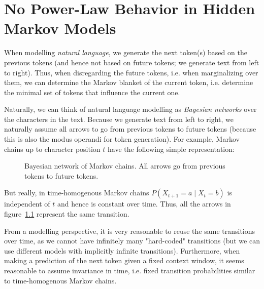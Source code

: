 \documentclass[../../main.tex]{subfiles}
\begin{document}
\chapter{No Power-Law Behavior in Hidden Markov Models}
    \label{section:no_power-law_in_hidden_markov_models}
    When modelling \emph{natural language}, we generate the next token(s) based on the previous tokens (and hence not based on future tokens; we generate text from left to right). Thus, when disregarding the future tokens, i.e. when marginalizing over them, we can determine the Markov blanket of the current token, i.e. determine the minimal set of tokens that influence the current one.

    Naturally, we can think of natural language modelling as \emph{Bayesian networks} over the characters in the text. Because we generate text from left to right, we naturally assume all arrows to go from previous tokens to future tokens (because this is also the modus operandi for token generation). For example, Markov chains up to character position $t$ have the following simple representation:

    \begin{figure}[h]
        \center
        \caption{Bayesian network of Markov chains. All arrows go from previous tokens to future tokens.}
        \label{fig:bayesian_network_markov_chain}
    \end{figure}

    But really, in time-homogenous Markov chains $P(X_{t + 1} = a \mid X_t = b)$ is independent of $t$ and hence is constant over time. Thus, all the arrows in figure~\ref{fig:bayesian_network_markov_chain} represent the same transition.

    From a modelling perspective, it is very reasonable to reuse the same transitions over time, as we cannot have infinitely many "hard-coded" transitions (but we can use different models with implicitly infinite transitions). Furthermore, when making a prediction of the next token given a fixed context window, it seems reasonable to assume invariance in time, i.e. fixed transition probabilities similar to time-homogenous Markov chains.
\end{document}
